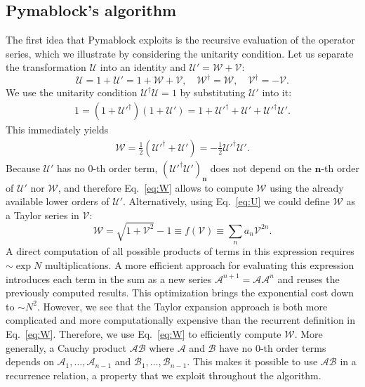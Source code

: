 \subsection{Pymablock's algorithm}
\label{sec:pymablock_algorithm}

The first idea that Pymablock exploits is the recursive evaluation of the operator series, which we illustrate by considering the unitarity condition.
Let us separate the transformation $\mathcal{U}$ into an identity and $\mathcal{U}' = \mathcal{W} + \mathcal{V}$:
%
\begin{equation}
\label{eq:U}
\mathcal{U} = 1 + \mathcal{U}' = 1 + \mathcal{W} + \mathcal{V},\quad \mathcal{W}^\dagger = \mathcal{W},\quad \mathcal{V}^\dagger = -\mathcal{V}.
\end{equation}
%
We use the unitarity condition $\mathcal{U}^\dagger \mathcal{U} = 1$ by substituting $\mathcal{U}'$ into it:
%
\begin{gather}
\label{eq:unitarity}
  1 = (1 + \mathcal{U}'^\dagger)(1+\mathcal{U}') = 1 + \mathcal{U}'^\dagger + \mathcal{U}' + \mathcal{U}'^\dagger \mathcal{U}'.
\end{gather}
%
This immediately yields \begin{gather}
\label{eq:W}
\mathcal{W} = \frac{1}{2}(\mathcal{U}'^\dagger + \mathcal{U}') = -\frac{1}{2} \mathcal{U}'^\dagger \mathcal{U}'.
\end{gather}
%
Because $\mathcal{U}'$ has no $0$-th order term, $(\mathcal{U}'^\dagger \mathcal{U}')_\mathbf{n}$ does not depend on the $\mathbf{n}$-th order of $\mathcal{U}'$ nor $\mathcal{W}$, and therefore Eq.~\eqref{eq:W} allows to compute $\mathcal{W}$ using the already available lower orders of $\mathcal{U}'$.
Alternatively, using Eq.~\eqref{eq:U} we could define $\mathcal{W}$ as a Taylor series in $\mathcal{V}$:
%
$$
\mathcal{W} = \sqrt{1 + \mathcal{V}^2} - 1 \equiv f(\mathcal{V}) \equiv \sum_n a_n \mathcal{V}^{2n}.
$$
%
A direct computation of all possible products of terms in this expression requires $\sim \exp N$ multiplications.
A more efficient approach for evaluating this expression introduces each term in the sum as a new series $\mathcal{A}^{n+1} = \mathcal{A}\mathcal{A}^{n}$ and reuses the previously computed results.
This optimization brings the exponential cost down to $\sim N^2$.
However, we see that the Taylor expansion approach is both more complicated and more computationally expensive than the recurrent definition in Eq.~\eqref{eq:W}.
Therefore, we use Eq.~\eqref{eq:W} to efficiently compute $\mathcal{W}$.
More generally, a Cauchy product $\mathcal{A}\mathcal{B}$ where $\mathcal{A}$ and $\mathcal{B}$ have no $0$-th order terms depends on $\mathcal{A}_1, \ldots, \mathcal{A}_{n-1}$ and $\mathcal{B}_1, \ldots, \mathcal{B}_{n-1}$.
This makes it possible to use $\mathcal{AB}$ in a recurrence relation, a property that we exploit throughout the algorithm.

